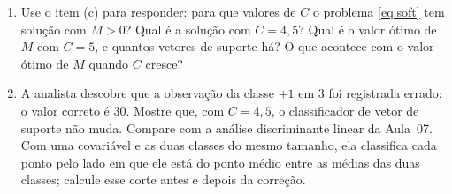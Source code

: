 \documentclass[11pt,a4paper]{article}
\begin{document}
\begin{exercicio}
\begin{enumerate}[label=(\alph*),leftmargin=1.1cm]
        sempre maior que $8$.
  \item Use o item (c) para responder: para que valores de $C$ o problema
        \eqref{eq:soft} tem solução com $M>0$? Qual é a solução com $C=4{,}5$? Qual é
        o valor ótimo de $M$ com $C=5$, e quantos vetores de suporte há? O que
        acontece com o valor ótimo de $M$ quando $C$ cresce?
  \item A analista descobre que a observação da classe $+1$ em $3$ foi registrada
        errado: o valor correto é $30$. Mostre que, com $C=4{,}5$, o classificador de
        vetor de suporte não muda. Compare com a análise discriminante linear da
        Aula~07. Com uma covariável e as duas classes do mesmo tamanho, ela classifica
        cada ponto pelo lado em que ele está do ponto médio entre as médias das duas
        classes; calcule esse corte antes e depois da correção.
\end{enumerate}
\end{exercicio}
\end{document}
